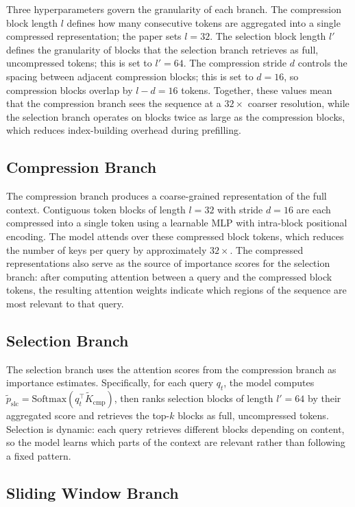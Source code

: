 \documentclass[11pt,letterpaper]{article}
\begin{document}
Three hyperparameters govern the granularity of each branch. The compression block length $l$
defines how many consecutive tokens are aggregated into a single compressed representation; the
paper sets $l = 32$. The selection block length $l'$ defines the granularity of blocks that the
selection branch retrieves as full, uncompressed tokens; this is set to $l' = 64$. The
compression stride $d$ controls the spacing between adjacent compression blocks; this is set to
$d = 16$, so compression blocks overlap by $l - d = 16$ tokens. Together, these values mean
that the compression branch sees the sequence at a $32\times$ coarser resolution, while the
selection branch operates on blocks twice as large as the compression blocks, which reduces
index-building overhead during prefilling.

\subsection{Compression Branch}

The compression branch produces a coarse-grained representation of the full context. Contiguous
token blocks of length $l = 32$ with stride $d = 16$ are each compressed into a single token
using a learnable MLP with intra-block positional encoding. The model attends over these
compressed block tokens, which reduces the number of keys per query by approximately $32\times$.
The compressed representations also serve as the source of importance scores for the selection
branch: after computing attention between a query and the compressed block tokens, the resulting
attention weights indicate which regions of the sequence are most relevant to that query.

\subsection{Selection Branch}

The selection branch uses the attention scores from the compression branch as importance
estimates. Specifically, for each query $q_t$, the model computes
$\tilde{p}_{\text{slc}} = \mathrm{Softmax}(q_t^\top \tilde{K}_{\text{cmp}})$, then ranks
selection blocks of length $l' = 64$ by their aggregated score and retrieves the top-$k$ blocks
as full, uncompressed tokens. Selection is dynamic: each query retrieves different blocks
depending on content, so the model learns which parts of the context are relevant rather than
following a fixed pattern.

\subsection{Sliding Window Branch}
\end{document}
